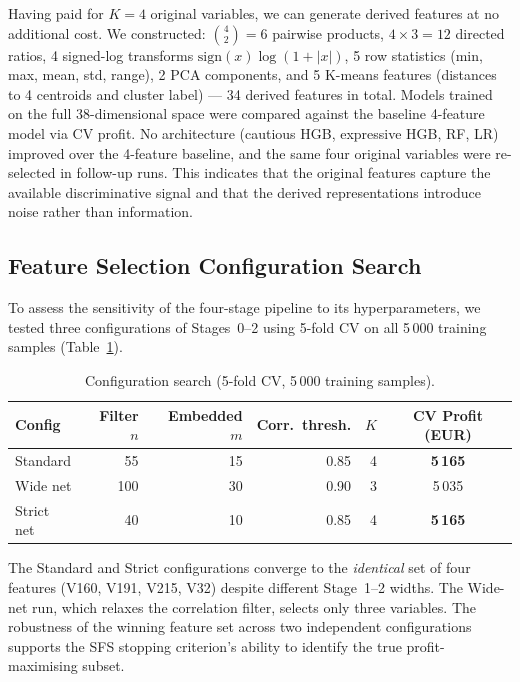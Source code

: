 \documentclass[11pt,a4paper]{article}
\begin{document}
Having paid for $K = 4$ original variables, we can generate derived features at no additional
cost. We constructed: $\binom{4}{2} = 6$ pairwise products, $4 \times 3 = 12$ directed
ratios, 4 signed-log transforms $\mathrm{sign}(x)\log(1+|x|)$, 5 row statistics (min, max,
mean, std, range), 2 PCA components, and 5 K-means features (distances to 4 centroids and
cluster label) --- 34 derived features in total. Models trained on the full 38-dimensional
space were compared against the baseline 4-feature model via CV profit. No architecture
(cautious HGB, expressive HGB, RF, LR) improved over the 4-feature baseline, and the same
four original variables were re-selected in follow-up runs. This indicates that the original
features capture the available discriminative signal and that the derived representations
introduce noise rather than information.

\subsection{Feature Selection Configuration Search}

To assess the sensitivity of the four-stage pipeline to its hyperparameters, we tested three
configurations of Stages~0--2 using 5-fold CV on all 5\,000 training samples
(Table~\ref{tab:configs}).

\begin{table}[H]
\centering
\caption{Configuration search (5-fold CV, 5\,000 training samples).}
\label{tab:configs}
\begin{tabular}{@{}lrrrrc@{}}
\toprule
Config & Filter $n$ & Embedded $m$ & Corr.\ thresh. & $K$ & CV Profit (EUR) \\
\midrule
Standard   & 55  & 15 & 0.85 & 4 & \textbf{5\,165} \\
Wide net   & 100 & 30 & 0.90 & 3 &           5\,035 \\
Strict net & 40  & 10 & 0.85 & 4 & \textbf{5\,165} \\
\bottomrule
\end{tabular}
\end{table}

The Standard and Strict configurations converge to the \emph{identical} set of four features
(V160, V191, V215, V32) despite different Stage~1--2 widths.
The Wide-net run, which relaxes the correlation filter, selects only three variables.
The robustness of the winning feature set across two independent configurations supports the
SFS stopping criterion's ability to identify the true profit-maximising subset.
\end{document}
